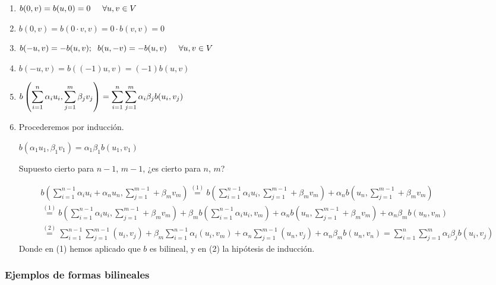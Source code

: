 \documentclass[10pt, a4paper]{article}
\makeatletter
\renewenvironment{proof}[1][\proofname] {\par\pushQED{\qed}\normalfont\topsep6\p@\@plus6\p@\relax\trivlist\item[\hskip\labelsep\itshape\sffamily#1\@addpunct{.}]\ignorespaces}{\popQED\endtrivlist\@endpefalse}
\theoremstyle{theorem-style}
\theoremstyle{definition-style}
\theoremstyle{remark-style}
\theoremstyle{example-style}
\theoremstyle{definition-style}
\theoremstyle{remark-style}
\makeatother
\begin{document}
\begin{enumerate}
	\item $b(0,v) = b(u, 0) = 0 \hspace{5mm}\forall u,v \in V$
	\begin{proof}
	$b(0,v)=b(0\cdot v, v) = 0 \cdot b(v,v) = 0 $
\end{proof}
	\item $b(-u,v)=-b(u,v); \hspace{2mm} b(u,-v)=-b(u,v) \hspace{5mm} \forall u,v \in V$
	\begin{proof}
	$b(-u,v)=b((-1)u,v)=(-1)b(u,v)$
	\end{proof}
	\item $ \mathlarger{b\left(\sum^n_{i=1}\alpha_iu_i, \sum_{j=1}^m \beta_j v_j \right) = \sum_{i=1}^n \sum_{j=1}^m \alpha_i \beta_j b(u_i,v_j)}$
	\begin{proof}
	Procederemos por inducción.
	
	 \hspace{3mm} $b(\alpha_1 u_1, \beta_1 v_1) = \alpha_1 \beta_1 b(u_1,v_1)$
	
	Supuesto cierto para $n-1$, $m-1$, ¿es cierto para $n$, $m$?
	
	\begin{align*}
	b \left( \sum_{i=1}^{n-1} \alpha_i u_i + \alpha_n u_n, \sum_{j=1}^{m-1} + \beta_m v_m \right) \stackrel{(1)}{=}
	b \left( \sum_{i=1}^{n-1} \alpha_i u_i, \sum_{j=1}^{m-1} + \beta_m v_m \right) +
	\alpha_n b \left(u_n, \sum_{j=1}^{m-1} + \beta_m v_m \right) \\
	\stackrel{(1)}{=}b \left( \sum_{i=1}^{n-1} \alpha_i u_i, \sum_{j=1}^{m-1} + \beta_m v_m \right) +
	\beta_m b \left( \sum_{i=1}^{n-1} \alpha_i u_i,  v_m \right) +
	\alpha_n b \left( u_n, \sum_{j=1}^{m-1} + \beta_m v_m \right) +
	\alpha_n \beta_m b \left( u_n, v_m \right) \\
	\stackrel{(2)}{=} \sum_{i=1}^{n-1} \sum_{j=1}^{m-1} (u_i, v_j) + \beta_m \sum_{i=1}^{n-1} \alpha_i (u_i,v_m) + \alpha_n  \sum_{j=1}^{m-1}(u_n, v_j) + \alpha_n \beta_m b(u_n, v_n)=\sum_{i=1}^{n} \sum_{j=1}^{m}	\alpha_i \beta_j b(u_i, v_j)
\end{align*}
Donde en (1) hemos aplicado que $b$ es bilineal, y en (2) la hipótesis de inducción.
\end{proof}
\end{enumerate}

\pagebreak

\subsubsection{Ejemplos de formas bilineales}
\end{document}

